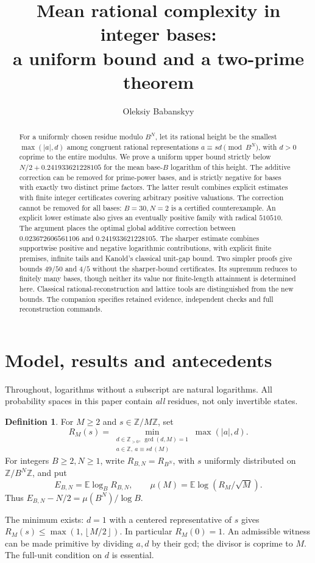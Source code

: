 \documentclass[11pt]{article}
\title{Mean rational complexity in integer bases:\\
a uniform bound and a two-prime theorem}
\author{Oleksiy Babanskyy}
\date{}
\theoremstyle{definition}\newtheorem{definition}[theorem]{Definition}
\theoremstyle{remark}\newtheorem{remark}[theorem]{Remark}
\newcommand{\E}{\mathbb E}
\newcommand{\Z}{\mathbb Z}
\newcommand{\floor}[1]{\left\lfloor #1\right\rfloor}
\begin{document}
\maketitle
\begin{abstract}
For a uniformly chosen residue modulo \(B^N\), let its rational height be
the smallest \(\max(|a|,d)\) among congruent rational representations
\(a\equiv sd\pmod {B^N}\), with \(d>0\) coprime to the entire modulus.
We prove a uniform upper bound strictly below \(N/2+0.241933621228105\) for the mean
base-\(B\) logarithm of this height. The additive correction can be removed
for prime-power bases, and is strictly negative for bases with exactly two
distinct prime factors. The latter result combines explicit estimates with
finite integer certificates covering arbitrary positive valuations.
The correction cannot be removed for all bases: \(B=30,N=2\) is a certified
counterexample. An explicit lower estimate also gives an eventually
positive family with radical \(510510\).
The argument places the optimal global additive correction
between \(0.023672606561106\) and \(0.241933621228105\).
The sharper estimate combines supportwise positive and negative logarithmic
contributions, with explicit finite premises, infinite tails and Kanold's
classical unit-gap bound. Two simpler proofs give bounds \(49/50\) and
\(4/5\) without the sharper-bound certificates.
Its supremum reduces to finitely many bases, though neither its value
nor finite-length attainment is determined here.
Classical rational-reconstruction and lattice tools are distinguished
from the new bounds. The companion specifies retained evidence,
independent checks and full reconstruction commands.
\end{abstract}

\section{Model, results and antecedents}
Throughout, logarithms without a subscript are natural logarithms.
All probability spaces in this paper contain \emph{all} residues, not only
invertible states.

\begin{definition}
For \(M\ge2\) and \(s\in\Z/M\Z\), set
\[
 R_M(s)=\min_{\substack{d\in\Z_{>0},\ \gcd(d,M)=1\\a\in\Z,\ a\equiv sd\ (M)}}
          \max(|a|,d).
\]
For integers \(B\ge2,N\ge1\), write \(R_{B,N}=R_{B^N}\), with \(s\)
uniformly distributed on \(\Z/B^N\Z\), and put
\[
 E_{B,N}=\E\log_B R_{B,N},\qquad
 \mu(M)=\E\log(R_M/\sqrt M).
\]
Thus \(E_{B,N}-N/2=\mu(B^N)/\log B\).
\end{definition}
The minimum exists: \(d=1\) with a centered representative of \(s\) gives
\(R_M(s)\le\max(1,\floor{M/2})\). In particular \(R_M(0)=1\).
An admissible witness can be made primitive by dividing \(a,d\) by their
gcd; the divisor is coprime to \(M\). The full-unit condition on \(d\) is
essential.
\end{document}
